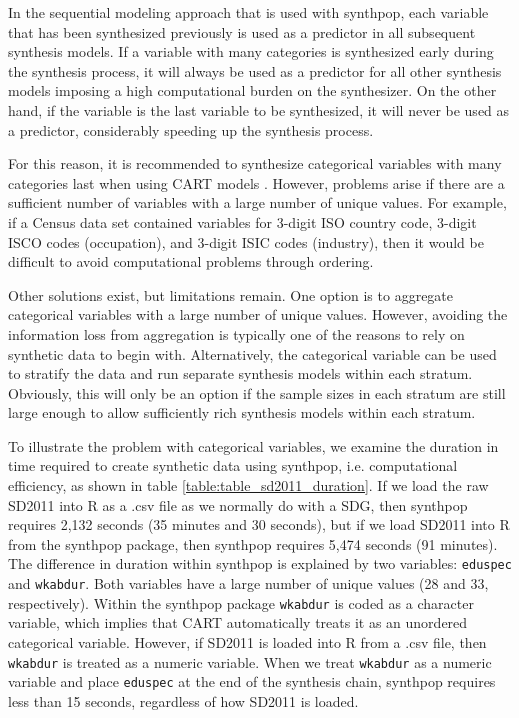 \documentclass[runningheads]{llncs}
\begin{document}
In the sequential modeling approach that is used with synthpop, each variable that has been synthesized previously is used as a predictor in all subsequent synthesis models.  If a variable with many categories is synthesized early during the synthesis process, it will always be used as a predictor for all other synthesis models imposing a high computational burden on the synthesizer. On the other hand, if the variable is the last variable to be synthesized, it will never be used as a predictor, considerably speeding up the synthesis process. 

For this reason, it is recommended to synthesize categorical variables with many categories last when using CART models \cite{raab2017guidelines}.  However, problems arise if there are a sufficient number of variables with a large number of unique values.  For example, if a Census data set contained variables for 3-digit ISO country code, 3-digit ISCO codes (occupation), and 3-digit ISIC codes (industry), then it would be difficult to avoid computational problems through ordering.  

Other solutions exist, but limitations remain.  One option is to aggregate categorical variables with a large number of unique values.  However, avoiding the information loss from aggregation is typically one of the reasons to rely on synthetic data to begin with.  Alternatively, the categorical variable can be used to stratify the data and run separate synthesis models within each stratum. Obviously, this will only be an option if the sample sizes in each stratum are still large enough to allow sufficiently rich synthesis models within each stratum.

To illustrate the problem with categorical variables, we examine the duration in time required to create synthetic data using synthpop, i.e. computational efficiency, as shown in table \ref{table:table_sd2011_duration}.  If we load the raw SD2011 into \textsf{R} as a .csv file as we normally do with a SDG, then synthpop requires 2,132 seconds (35 minutes and 30 seconds), but if we load SD2011 into \textsf{R} from the synthpop package, then synthpop requires 5,474 seconds (91 minutes).  The difference in duration within synthpop is explained by two variables: \texttt{eduspec} and \texttt{wkabdur}.  Both variables have a large number of unique values (28 and 33, respectively). Within the synthpop package \texttt{wkabdur} is coded as a character variable, which implies that CART automatically treats it as an unordered categorical variable.  However, if SD2011 is loaded into \textsf{R} from a .csv file, then \texttt{wkabdur} is treated as a numeric variable.  When we treat \texttt{wkabdur} as a numeric variable and place \texttt{eduspec} at the end of the synthesis chain, synthpop requires less than 15 seconds, regardless of how SD2011 is loaded.  
\end{document}
